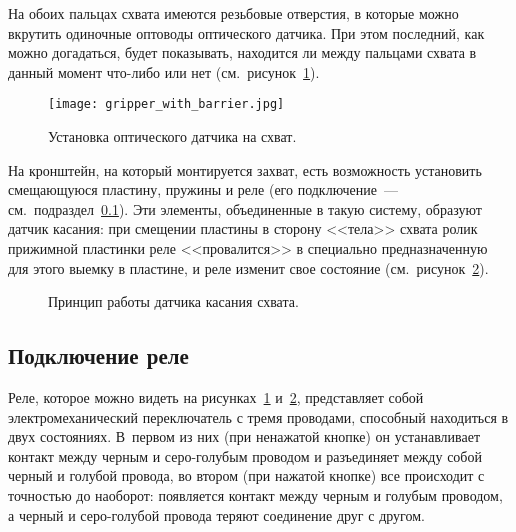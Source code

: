 На обоих пальцах схвата имеются резьбовые отверстия, в которые можно вкрутить одиночные оптоводы оптического датчика.
При этом последний, как можно догадаться, будет показывать, находится ли между пальцами схвата в данный момент что-либо или нет (см.~рисунок~\ref{img_gripper_with_barrier}).

\begin{figure}[h!]
	\centering
	\texttt{[image: gripper\_with\_barrier.jpg]}
	\caption{Установка оптического датчика на схват.}
	\label{img_gripper_with_barrier}
\end{figure}

На кронштейн, на который монтируется захват, есть возможность установить смещающуюся пластину, пружины и реле (его подключение~--- см.~подраздел~\ref{part_relay_connect}).
Эти элементы, объединенные в такую систему, образуют датчик касания: при смещении пластины в сторону <<тела>> схвата ролик прижимной пластинки реле <<провалится>> в специально предназначенную для этого выемку в пластине, и реле изменит свое состояние (см.~рисунок~\ref{img_touch_sensor}).

\begin{figure}[h]
	\begin{minipage}[h]{0.49\linewidth}
	\end{minipage}
	\hfill
	\begin{minipage}[h]{0.49\linewidth}
	\end{minipage}
	\caption{Принцип работы датчика касания схвата.}
	\label{img_touch_sensor}
\end{figure}



\subsection{Подключение реле}\label{part_relay_connect}
Реле, которое можно видеть на рисунках~\ref{img_gripper_with_barrier} и~\ref{img_touch_sensor}, представляет собой электромеханический переключатель с тремя проводами, способный находиться в двух состояниях.
В~первом из них (при ненажатой кнопке) он устанавливает контакт между черным и серо-голубым проводом и разъединяет между собой черный и голубой провода, во втором (при нажатой кнопке) все происходит с точностью до наоборот: появляется контакт между черным и голубым проводом, а черный и серо-голубой провода теряют соединение друг с другом.

